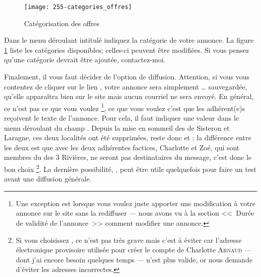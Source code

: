 
    \begin{figure}
        \centering
        \texttt{[image: 255-categories\_offres]}
        \caption{Catégorisation des offres}
        \label{fig:categories_offres}
    \end{figure}
    
Dans le menu déroulant intitulé  indiquez la catégorie de votre annonce. La figure \ref{fig:categories_offres} liste les catégories disponibles; celles-ci peuvent être modifiées. Si vous pensez qu'une catégorie devrait être ajoutée, contactez-moi.


\label{sec:sauvegarder_diffuser}

\label{page:choixLocalite}
Finalement, il vous faut décider de l'option de diffusion. Attention, si vous vous contentez de cliquer sur le lien , votre annonce sera simplement … sauvegardée, \cad{} qu’elle apparaîtra bien sur le site mais aucun courriel ne sera envoyé. En général, ce n’est pas ce que vous voulez%
\footnote{Une exception est lorsque vous voulez juste apporter une modification à votre annonce sur le site sans la rediffuser --- nous avons vu à la section  <<~Durée de validité de l'annonce~>>  comment modifier une annonce.},
ce que vous voulez c’est que les adhérent(e)s reçoivent le texte de l’annonce. Pour cela, il faut indiquer une valeur dans le menu déroulant du champ . Depuis la mise en sommeil des \sel{} de Sisteron et  Laragne, ces deux localités ont été supprimées, reste donc  et ; la différence entre les deux est que avec  les deux adhérentes factices, Charlotte et Zoé, qui sont membres du \sel{} des 3 Rivières, ne seront pas destinataires du message, c'est donc le bon choix%
\footnote{Si vous choisissez , ce n'est pas très grave mais c'est à éviter car l'adresse électronique provisoire utilisée pour créer le compte de Charlotte \textsc{Arnaud} --- dont j'ai encore besoin quelques temps --- n'est plus valide, or \CF nous demande d'éviter les adresses incorrectes.}.
La dernière possibilité, ,  peut être utile quelquefois pour faire un test avant une diffusion générale. 


